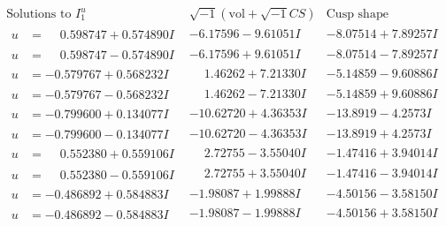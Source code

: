 \documentclass[1p]{elsarticle_modified}
\theoremstyle{definition}
\newcommand{\I}{\sqrt{-1}}
\begin{document}
$$\begin{array}{c|c|c}  
\text{Solutions to }I^u_{1}& \I (\text{vol} + \sqrt{-1}CS) & \text{Cusp shape}\\
 \hline 
\begin{aligned}
u &= \phantom{-}0.598747 + 0.574890 I\end{aligned}
 & -6.17596 - 9.61051 I & -8.07514 + 7.89257 I \\ \hline\begin{aligned}
u &= \phantom{-}0.598747 - 0.574890 I\end{aligned}
 & -6.17596 + 9.61051 I & -8.07514 - 7.89257 I \\ \hline\begin{aligned}
u &= -0.579767 + 0.568232 I\end{aligned}
 & \phantom{-}1.46262 + 7.21330 I & -5.14859 - 9.60886 I \\ \hline\begin{aligned}
u &= -0.579767 - 0.568232 I\end{aligned}
 & \phantom{-}1.46262 - 7.21330 I & -5.14859 + 9.60886 I \\ \hline\begin{aligned}
u &= -0.799600 + 0.134077 I\end{aligned}
 & -10.62720 + 4.36353 I & -13.8919 - 4.2573 I \\ \hline\begin{aligned}
u &= -0.799600 - 0.134077 I\end{aligned}
 & -10.62720 - 4.36353 I & -13.8919 + 4.2573 I \\ \hline\begin{aligned}
u &= \phantom{-}0.552380 + 0.559106 I\end{aligned}
 & \phantom{-}2.72755 - 3.55040 I & -1.47416 + 3.94014 I \\ \hline\begin{aligned}
u &= \phantom{-}0.552380 - 0.559106 I\end{aligned}
 & \phantom{-}2.72755 + 3.55040 I & -1.47416 - 3.94014 I \\ \hline\begin{aligned}
u &= -0.486892 + 0.584883 I\end{aligned}
 & -1.98087 + 1.99888 I & -4.50156 - 3.58150 I \\ \hline\begin{aligned}
u &= -0.486892 - 0.584883 I\end{aligned}
 & -1.98087 - 1.99888 I & -4.50156 + 3.58150 I \\ \hline\begin{aligned}

\end{aligned}
\end{array}$$
\end{document}

